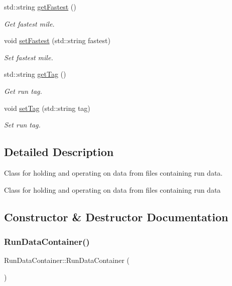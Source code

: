 \begin{DoxyCompactItemize}
std\+::string \mbox{\hyperlink{classRunDataContainer_afeb2371897072dd87a6eeafd3012c11b}{get\+Fastest}} ()
\begin{DoxyCompactList}\small\item\em Get fastest mile. \end{DoxyCompactList}\item 
void \mbox{\hyperlink{classRunDataContainer_a5a8a3e05193d52b47d9967b2ddb917e2}{set\+Fastest}} (std\+::string fastest)
\begin{DoxyCompactList}\small\item\em Set fastest mile. \end{DoxyCompactList}\item 
std\+::string \mbox{\hyperlink{classRunDataContainer_ada1b710cd872b845862ba24bf632e9fd}{get\+Tag}} ()
\begin{DoxyCompactList}\small\item\em Get run tag. \end{DoxyCompactList}\item 
void \mbox{\hyperlink{classRunDataContainer_adea33b489fa230a0d1c37fbdb5f0227b}{set\+Tag}} (std\+::string tag)
\begin{DoxyCompactList}\small\item\em Set run tag. \end{DoxyCompactList}\end{DoxyCompactItemize}


\subsection{Detailed Description}
Class for holding and operating on data from files containing run data. 

Class for holding and operating on data from files containing run data 

\subsection{Constructor \& Destructor Documentation}
\mbox{\label{classRunDataContainer_ad567340214b5aad21b160d198d7d8e18}} 
\subsubsection{\texorpdfstring{RunDataContainer()}{RunDataContainer()}}
{\footnotesize\ttfamily Run\+Data\+Container\+::\+Run\+Data\+Container (\begin{DoxyParamCaption}{ }\end{DoxyParamCaption})}



